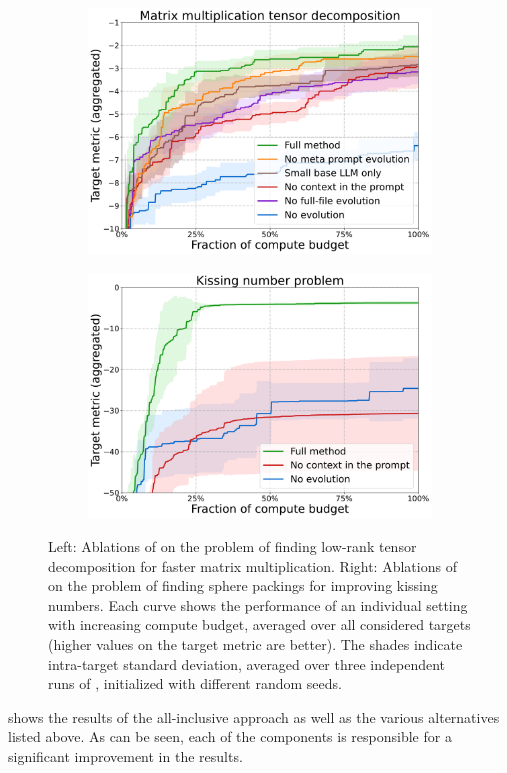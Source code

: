 \begin{figure}
\centering
\begin{subfigure}[c]{0.48\textwidth}
    \centering
    \includegraphics[width=1.0\textwidth]{figures/ablation_matmul.pdf}
\end{subfigure}%
\hfill
\begin{subfigure}[c]{0.48\textwidth}
    \centering
    \includegraphics[width=1.0\textwidth]{figures/ablation_kissing.pdf}
\end{subfigure}%
\caption{Left: Ablations of \method on the problem of finding low-rank tensor decomposition for faster matrix multiplication. Right: Ablations of \method on the problem of finding sphere packings for improving kissing numbers. Each curve shows the performance of an individual setting with increasing compute budget, averaged over all considered targets (higher values on the target metric are better). The shades indicate intra-target standard deviation, averaged over three independent runs of \method, initialized with different random seeds.%
\label{fig:ablations_rewrite}}
\end{figure}

 shows the results of the all-inclusive \method approach as well as the various alternatives listed above. As can be seen, each of the components is responsible for a significant improvement in the results. 
